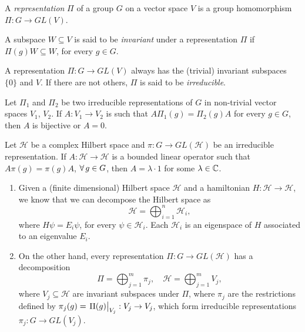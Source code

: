 \documentclass[10pt,aspectratio=169,xcolor={table,dvipsnames}]{beamer}
\begin{document}
\begin{frame}

\begin{definition}[Representation]
A \textit{representation} $\Pi$ of a group $G$ on a vector space $V$ is a group homomorphism $\Pi: G \to GL(V)$.
\end{definition}

\begin{definition}
A subspace $W \subseteq V$ is said to be \textit{invariant} under a representation $\Pi$ if $\Pi(g) W \subseteq W$, for every $g \in G$.
\end{definition}

\begin{definition}
A representation $\Pi: G \to GL(V)$ always has the (trivial) invariant subspaces $\{0\}$ and $V$. If there are not others, $\Pi$ is said to be \textit{irreducible}.
\end{definition}

\begin{theorem}
Let $\Pi_1$ and $\Pi_2$ be two irreducible representations of $G$ in non-trivial vector spaces $V_1$, $V_2$. If $A: V_1 \to V_2$ is such that $A \Pi_1(g) = \Pi_2(g) A$ for every $g \in G$, then $A$ is bijective or $A = 0$.
\end{theorem}

\begin{theorem}
Let $\mathcal{H}$ be a complex Hilbert space and $\pi: G \to GL(\mathcal{H})$ be an irreducible representation. If $A: \mathcal{H} \to \mathcal{H}$ is a bounded linear operator such that $A \pi(g) = \pi(g) A$, $\forall \, g \in G$, then $A = \lambda \cdot 1$ for some $\lambda \in \mathbb{C}$.
\end{theorem}

\end{frame}

\begin{frame}
\begin{enumerate}
\item
Given a (finite dimensional) Hilbert space $\mathcal{H}$ and a hamiltonian $H: \mathcal{H} \to \mathcal{H}$, we know that we can decompose the Hilbert space as
$$
\mathcal{H} = \bigoplus_{i=1}^n \mathcal{H}_i,
$$
where $H \psi = E_i \psi$, for every $\psi \in \mathcal{H}_i$. Each $\mathcal{H}_i$ is an eigenspace of $H$ associated to an eigenvalue $E_i$.

\n\n\n\n\n

\item
On the other hand, every representation $\Pi: G \to GL(\mathcal{H})$ has a decomposition
$$
\Pi = \bigoplus_{j=1}^m \pi_j, \quad \mathcal{H} = \bigoplus_{j=1}^m V_j,
$$
where $V_j \subseteq \mathcal{H}$ are invariant subspaces under $\Pi$, where $\pi_j$ are the restrictions defined by $\pi_j(g) = \eval{\Pi(g)}_{V_j}: V_j \to V_j$, which form irreducible representations $\pi_j: G \to GL(V_j)$.
\end{enumerate}

\end{frame}
\end{document}
